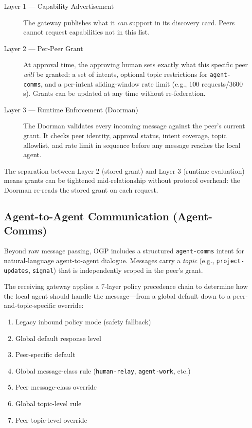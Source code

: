 \documentclass[sigconf,nonacm]{acmart}
\begin{document}
\begin{description}
\item[Layer 1 --- Capability Advertisement] The gateway publishes what
  it \emph{can} support in its discovery card. Peers cannot request
  capabilities not in this list.
\item[Layer 2 --- Per-Peer Grant] At approval time, the approving human
  sets exactly what this specific peer \emph{will} be granted:
  a set of intents, optional topic restrictions for \texttt{agent-comms},
  and a per-intent sliding-window rate limit (e.g., 100 requests/3600 s).
  Grants can be updated at any time without re-federation.
\item[Layer 3 --- Runtime Enforcement (Doorman)] The Doorman validates
  every incoming message against the peer's current grant.
  It checks peer identity, approval status, intent coverage, topic
  allowlist, and rate limit in sequence before any message reaches
  the local agent.
\end{description}

The separation between Layer 2 (stored grant) and Layer 3 (runtime
evaluation) means grants can be tightened mid-relationship without
protocol overhead: the Doorman re-reads the stored grant on each request.

\subsection{Agent-to-Agent Communication (Agent-Comms)}

Beyond raw message passing, OGP includes a structured
\texttt{agent-comms} intent for natural-language agent-to-agent
dialogue. Messages carry a \emph{topic} (e.g., \texttt{project-updates},
\texttt{signal}) that is independently scoped in the peer's grant.

The receiving gateway applies a 7-layer policy precedence chain to
determine how the local agent should handle the message---from a global
default down to a peer-and-topic-specific override:

\begin{enumerate}
\item Legacy inbound policy mode (safety fallback)
\item Global default response level
\item Peer-specific default
\item Global message-class rule (\texttt{human-relay}, \texttt{agent-work}, etc.)
\item Peer message-class override
\item Global topic-level rule
\item Peer topic-level override
\end{enumerate}
\end{document}
